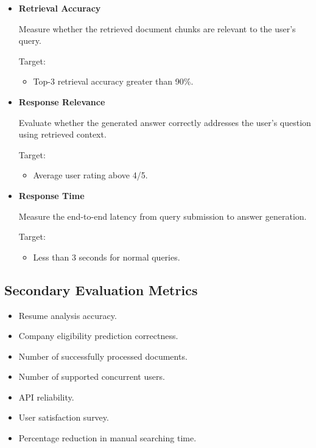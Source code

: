 \documentclass[11pt]{article}
\begin{document}
\begin{itemize}

\item \textbf{Retrieval Accuracy}

Measure whether the retrieved document chunks are relevant to the user's query.

Target:
\begin{itemize}
\item Top-3 retrieval accuracy greater than 90\%.
\end{itemize}

\item \textbf{Response Relevance}

Evaluate whether the generated answer correctly addresses the user's question using retrieved context.

Target:
\begin{itemize}
\item Average user rating above 4/5.
\end{itemize}

\item \textbf{Response Time}

Measure the end-to-end latency from query submission to answer generation.

Target:
\begin{itemize}
\item Less than 3 seconds for normal queries.
\end{itemize}

\end{itemize}

\subsection{Secondary Evaluation Metrics}

\begin{itemize}

\item Resume analysis accuracy.

\item Company eligibility prediction correctness.

\item Number of successfully processed documents.

\item Number of supported concurrent users.

\item API reliability.

\item User satisfaction survey.

\item Percentage reduction in manual searching time.

\end{itemize}
\end{document}
